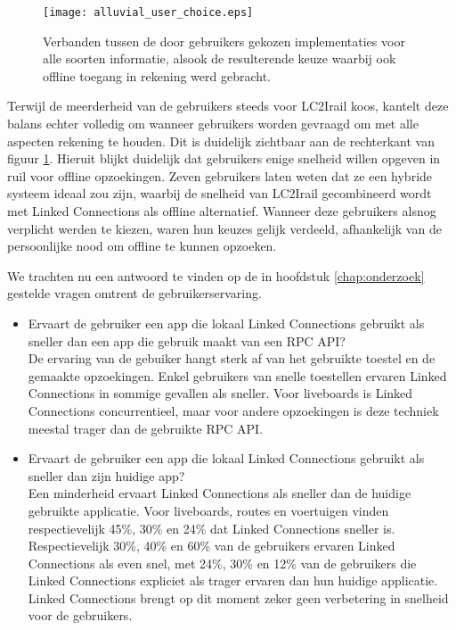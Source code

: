 \begin{figure}[ht]
	\centering
	\texttt{[image: alluvial\_user\_choice.eps]}
	\caption[Door gebruikers gekozen implementatie]{Verbanden tussen de door gebruikers gekozen implementaties voor alle soorten informatie, alsook de resulterende keuze waarbij ook offline toegang in rekening werd gebracht. }
	\label{fig:alluvialUserChoices}
\end{figure}

Terwijl de meerderheid van de gebruikers steeds voor LC2Irail koos, kantelt deze balans echter volledig om wanneer gebruikers worden gevraagd om met alle aspecten rekening te houden. Dit is duidelijk zichtbaar aan de rechterkant van figuur \ref{fig:alluvialUserChoices}. Hieruit blijkt duidelijk dat gebruikers enige snelheid willen opgeven in ruil voor offline opzoekingen. Zeven gebruikers laten weten dat ze een hybride systeem ideaal zou zijn, waarbij de snelheid van LC2Irail gecombineerd wordt met Linked Connections als offline alternatief. Wanneer deze gebruikers alsnog verplicht werden te kiezen, waren hun keuzes gelijk verdeeld, afhankelijk van de persoonlijke nood om offline te kunnen opzoeken. 


We trachten nu een antwoord te vinden op de in hoofdstuk \ref{chap:onderzoek} gestelde vragen omtrent de gebruikerservaring.
\begin{itemize}
	\item Ervaart de gebruiker een app die lokaal Linked Connections gebruikt als sneller dan een app die gebruik maakt van een RPC API?\\
	De ervaring van de gebuiker hangt sterk af van het gebruikte toestel en de gemaakte opzoekingen. Enkel gebruikers van snelle toestellen ervaren Linked Connections in sommige gevallen als sneller. Voor liveboards is Linked Connections concurrentieel, maar voor andere opzoekingen is deze techniek meestal trager dan de gebruikte RPC API.
	\item Ervaart de gebruiker een app die lokaal Linked Connections gebruikt als sneller dan zijn huidige app?\\
	Een minderheid ervaart Linked Connections als sneller dan de huidige gebruikte applicatie. Voor liveboards, routes en voertuigen vinden respectievelijk 45\%, 30\% en 24\% dat Linked Connections sneller is. Respectievelijk 30\%, 40\% en 60\% van de gebruikers ervaren Linked Connections als even snel, met 24\%, 30\% en 12\% van de gebruikers die Linked Connections expliciet als trager ervaren dan hun huidige applicatie. Linked Connections brengt op dit moment zeker geen verbetering in snelheid voor de gebruikers.
\end{itemize}

